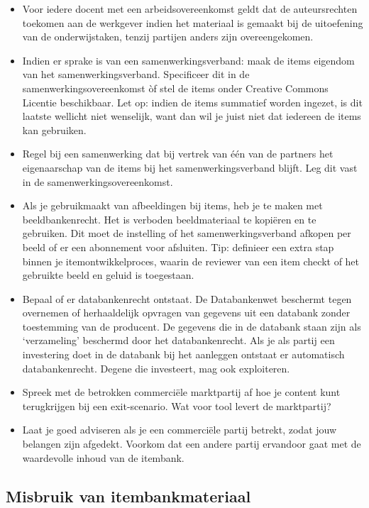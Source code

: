 \documentclass[
]{book}
\providecommand{\tightlist}{%
  \setlength{\itemsep}{0pt}\setlength{\parskip}{0pt}}
\begin{document}
\begin{itemize}
\tightlist
\item
  Voor iedere docent met een arbeidsovereenkomst geldt dat de auteursrechten toekomen aan de werkgever indien het materiaal is gemaakt bij de uitoefening van de onderwijstaken, tenzij partijen anders zijn overeengekomen.
\item
  Indien er sprake is van een samenwerkingsverband: maak de items eigendom van het samenwerkingsverband. Specificeer dit in de samenwerkingsovereenkomst òf stel de items onder Creative Commons Licentie beschikbaar. Let op: indien de items summatief worden ingezet, is dit laatste wellicht niet wenselijk, want dan wil je juist niet dat iedereen de items kan gebruiken.
\item
  Regel bij een samenwerking dat bij vertrek van één van de partners het eigenaarschap van de items bij het samenwerkingsverband blijft. Leg dit vast in de samenwerkingsovereenkomst.
\item
  Als je gebruikmaakt van afbeeldingen bij items, heb je te maken met beeldbankenrecht. Het is verboden beeldmateriaal te kopiëren en te gebruiken. Dit moet de instelling of het samenwerkingsverband afkopen per beeld of er een abonnement voor afsluiten. Tip: definieer een extra stap binnen je
  itemontwikkelproces, waarin de reviewer van een item checkt of het gebruikte beeld en geluid is toegestaan.
\item
  Bepaal of er databankenrecht ontstaat. De Databankenwet beschermt tegen overnemen of herhaaldelijk opvragen van gegevens uit een databank zonder toestemming van de producent. De gegevens die in de databank staan zijn als `verzameling' beschermd door het databankenrecht. Als je als partij een investering doet in de databank bij het aanleggen ontstaat er automatisch databankenrecht. Degene die investeert, mag ook exploiteren.
\item
  Spreek met de betrokken commerciële marktpartij af hoe je content kunt terugkrijgen bij een exit-scenario. Wat voor tool levert de marktpartij?
\item
  Laat je goed adviseren als je een commerciële partij betrekt, zodat jouw belangen zijn afgedekt. Voorkom dat een andere partij ervandoor gaat met de waardevolle inhoud van de itembank.
\end{itemize}

\hypertarget{misbruik-van-itembankmateriaal}{%
\subsection{Misbruik van itembankmateriaal}\label{misbruik-van-itembankmateriaal}}
\end{document}
